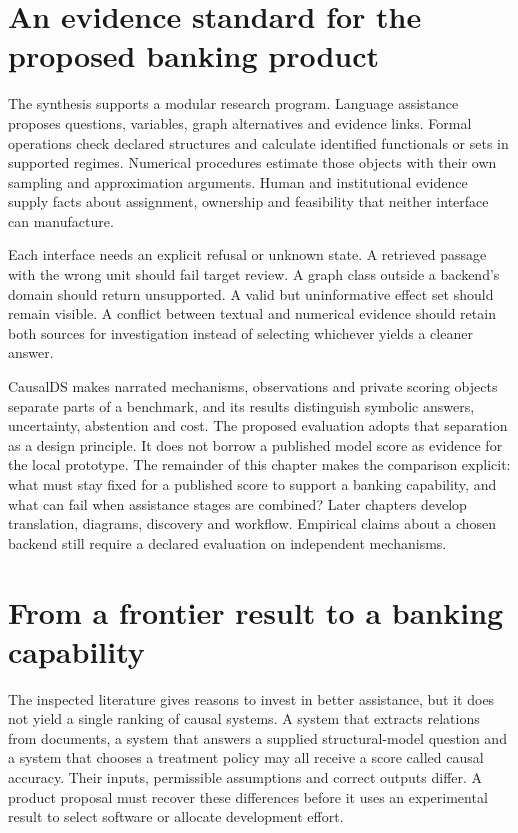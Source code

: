 \section{An evidence standard for the proposed banking product}

The synthesis supports a modular research program. Language assistance proposes
questions, variables, graph alternatives and evidence links. Formal operations
check declared structures and calculate identified functionals or sets in
supported regimes. Numerical procedures estimate those objects with their own
sampling and approximation arguments. Human and institutional evidence supply
facts about assignment, ownership and feasibility that neither interface can
manufacture.

Each interface needs an explicit refusal or unknown state. A retrieved passage
with the wrong unit should fail target review. A graph class outside a backend's
domain should return unsupported. A valid but uninformative effect set should
remain visible. A conflict between textual and numerical evidence should retain
both sources for investigation instead of selecting whichever yields a cleaner
answer.

CausalDS makes narrated mechanisms, observations and private scoring objects
separate parts of a benchmark, and its results distinguish symbolic answers,
uncertainty, abstention and cost. \cite{v12_la_2607_08093} The proposed evaluation
adopts that separation as a design principle. It does not borrow a published
model score as evidence for the local prototype. The remainder of this chapter
makes the comparison explicit: what must stay fixed for a published score to
support a banking capability, and what can fail when assistance stages are
combined? Later chapters develop translation, diagrams, discovery and workflow.
Empirical claims about a chosen backend still require a declared evaluation
on independent mechanisms.


\section{From a frontier result to a banking capability}
\label{exec13:frontier-synthesis}

The inspected literature gives reasons to invest in better assistance, but it
does not yield a single ranking of causal systems. A system that extracts
relations from documents, a system that answers a supplied structural-model
question and a system that chooses a treatment policy may all receive a score
called causal accuracy. Their inputs, permissible assumptions and correct
outputs differ. A product proposal must recover these differences before it
uses an experimental result to select software or allocate development effort.

